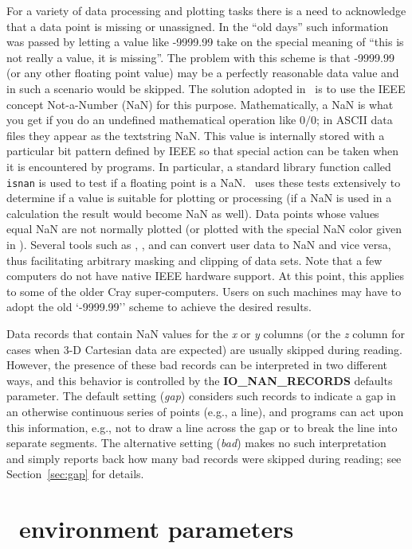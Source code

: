 For a variety of data processing and plotting tasks there is a need to acknowledge that
a data point is missing or unassigned.  In the ``old days'' such information was passed
by letting a value like -9999.99 take on the special meaning of ``this is not really a
value, it is missing''.  The problem with this scheme is that -9999.99 (or any other
floating point value) may be a perfectly reasonable data value and in such a scenario
would be skipped.  The solution adopted in \GMT\ is to use the IEEE concept Not-a-Number
(NaN) for this purpose.  Mathematically, a NaN is what you get if you do an undefined
mathematical operation like $0/0$; in ASCII data files they appear as the textstring NaN.
This value is internally stored with a particular bit pattern
defined by IEEE so that special action can be taken when it is encountered by programs.
In particular, a standard library function called \texttt{isnan} is used to test if a floating point
is a NaN.  \GMT\ uses these tests extensively to determine if a value is suitable for plotting
or processing (if a NaN is used in a calculation the result would become NaN as well).  Data points
whose values equal NaN are not normally plotted (or plotted with the special NaN color given in
).  Several tools such as , , and
 can convert user data to NaN and vice versa, thus facilitating arbitrary
masking and clipping of data sets.  Note that a few computers do not have native IEEE hardware
support.  At this point, this applies to some of the older Cray super-computers.  Users on such
machines may have to adopt the old `-9999.99'' scheme to achieve the desired results.

Data records that contain NaN values for the \emph{x} or \emph{y} columns (or the \emph{z} column
for cases when 3-D Cartesian data are expected) are usually skipped during reading.  However,
the presence of these bad records can be interpreted in two different ways, and this behavior
is controlled by the \textbf{IO\_NAN\_RECORDS} defaults parameter.  The default setting (\emph{gap})
considers such records to indicate a gap in an otherwise continuous series of points (e.g., a line),
and programs can act upon this information, e.g., not to draw a line across the gap or to break the line
into separate segments.  The alternative setting (\emph{bad}) makes no such interpretation and
simply reports back how many bad records were skipped during reading; see Section~\ref{sec:gap} for details.

\section{\gmt\ environment parameters}

